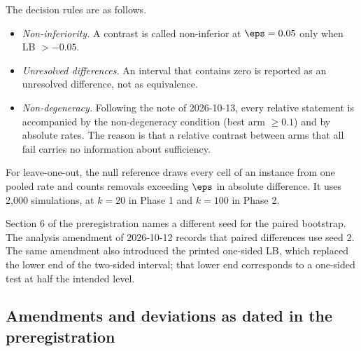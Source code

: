 The decision rules are as follows.
\begin{itemize}
\item \emph{Non-inferiority.} A contrast is called non-inferior at $\eps = 0.05$ only when LB $> -0.05$.
\item \emph{Unresolved differences.} An interval that contains zero is reported as an unresolved difference, not as equivalence.
\item \emph{Non-degeneracy.} Following the note of 2026-10-13, every relative statement is accompanied by the non-degeneracy condition (best arm $\geq 0.1$) and by absolute rates. The reason is that a relative contrast between arms that all fail carries no information about sufficiency.
\end{itemize}

For leave-one-out, the null reference draws every cell of an instance from one pooled rate and counts removals exceeding $\eps$ in absolute difference. It uses 2,000 simulations, at $k=20$ in Phase 1 and $k=100$ in Phase 2.

Section 6 of the preregistration names a different seed for the paired bootstrap. The analysis amendment of 2026-10-12 records that paired differences use seed 2. The same amendment also introduced the printed one-sided LB, which replaced the lower end of the two-sided interval; that lower end corresponds to a one-sided test at half the intended level.

\subsection{Amendments and deviations as dated in the preregistration}

